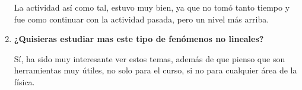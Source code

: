 \documentclass[a4paper]{article}
\begin{document}
\begin{center}
\begin{enumerate}
La actividad así como tal, estuvo muy bien, ya que no tomó tanto tiempo y fue como continuar con la actividad pasada, pero un nivel más arriba.

\item \textbf{¿Quisieras estudiar mas este tipo de fenómenos no lineales?}

Sí, ha sido muy interesante ver estos temas, además de que pienso que son herramientas muy útiles, no solo para el curso, si no para cualquier área de la física. 

\end{enumerate}

\end{center}
\end{document}
